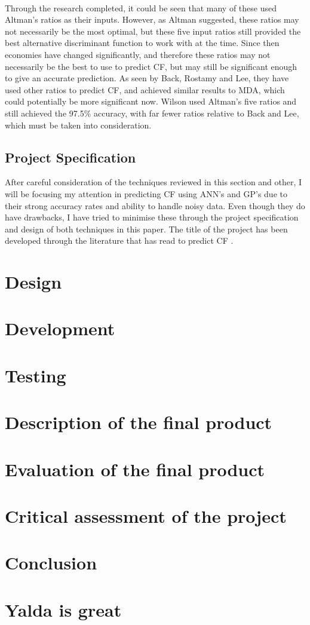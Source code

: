 \documentclass[11pt]{article}
\begin{document}
\\
Through the research completed, it could be seen that many of these used Altman's ratios as their inputs. However, as Altman suggested, these ratios may not necessarily be the most optimal, but these five input ratios still provided the best alternative discriminant function to work with at the time. Since then economies have changed significantly, and therefore these ratios may not necessarily be the best to use to predict CF, but may still be significant enough to give an accurate prediction. As seen by Back, Rostamy and Lee, they have used other ratios to predict CF, and achieved similar results to MDA, which could potentially be more significant now. Wilson used Altman's five ratios and still achieved the 97.5\% accuracy, with far fewer ratios relative to Back and Lee, which must be taken into consideration.\\

\subsection{Project Specification}
After careful consideration of the techniques reviewed in this section and other, I will be focusing my attention in predicting CF using ANN's and GP's due to their strong accuracy rates and ability to handle noisy data. Even though they do have drawbacks, I have tried to minimise these through the project specification and design of both techniques in this paper.  The title of the project has been developed through the literature that has read to predict CF .
\newpage
\section{Design}

\newpage
\section{Development}

\newpage
\section{Testing}

\newpage
\section{Description of the final product}

\newpage
\section{Evaluation of the final product}

\newpage
\section{Critical assessment of the project }

\newpage
\section{Conclusion}


\newpage
\section{Yalda is great}
\end{document}
